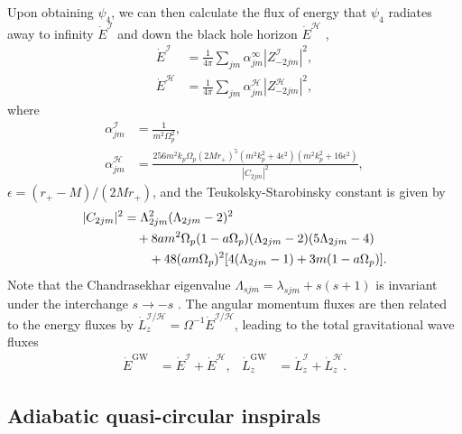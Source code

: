 \documentclass[%
 reprint,
 nofootinbib,
 amsmath,amssymb,
 aps,
 prd,
]{revtex4-2}
\begin{document}
Upon obtaining $\psi_4$, we can then calculate the flux of energy that $\psi_4$ radiates away to infinity $\dot{E}^\mathcal{I}$ and down the black hole horizon $\dot{E}^\mathcal{H}$ \cite{TeukPres74}, 
\begin{subequations} \label{eqn:fluxes}
\begin{align}
    \dot{E}^\mathcal{I} &= \frac{1}{4\pi} \sum_{jm} \alpha_{jm}^\infty {|Z^\mathcal{I}_{-2jm}|^2},
    \\
    \dot{E}^\mathcal{H} &= \frac{1}{4\pi} \sum_{jm} \alpha_{jm}^\mathcal{H} {|Z^\mathcal{H}_{-2jm}|^2},
\end{align}
\end{subequations}
where 
\begin{align*}
    \alpha_{jm}^\mathcal{I} &= \frac{1}{m^2\Omega_p^2},
    \\
    \alpha_{jm}^\mathcal{H} &= \frac{256m^2 k_p\Omega_p(2Mr_+)^5(m^2k_p^2+4\epsilon^2)(m^2k_p^2+16\epsilon^2)}{|C_{2jm}|^2},
\end{align*}
$\epsilon = (r_+ - M)/(2Mr_+)$, and the Teukolsky-Starobinsky constant is given by
\begin{align} 
    |C_{2jm}|^2 &=\Lambda_{2j m }^2(\Lambda_{2j m }-2)^2
    \\ \notag
    & \quad + 8 a m^2 \Omega_p(1 - a \Omega_p)(\Lambda_{2j m }-2)(5\Lambda_{2j m }-4)
    \\ \notag
    & \quad \quad
    +48 (a m \Omega_p)^2[4(\Lambda_{2j m }-1)+3m(1- a \Omega_p)].
\end{align}
Note that the Chandrasekhar eigenvalue $\Lambda_{sjm} = \lambda_{sjm} + s(s+1)$ is invariant under the interchange $s\rightarrow -s$ \cite{Chan83}.
The angular momentum fluxes are then related to the energy fluxes by $\dot{L}_z^{\mathcal{I}/\mathcal{H}} = \Omega^{-1} \dot{E}^{\mathcal{I}/\mathcal{H}}$, leading to the total gravitational wave fluxes
\begin{align}
    \dot{E}^\mathrm{GW} &= \dot{E}^\mathcal{I} + \dot{E}^\mathcal{H},
    &
    \dot{L}_z^\mathrm{GW} &= \dot{L}_z^\mathcal{I} + \dot{L}_z^\mathcal{H}.
\end{align}

\subsection{Adiabatic quasi-circular inspirals}
\label{sec:inspiral}
\end{document}

